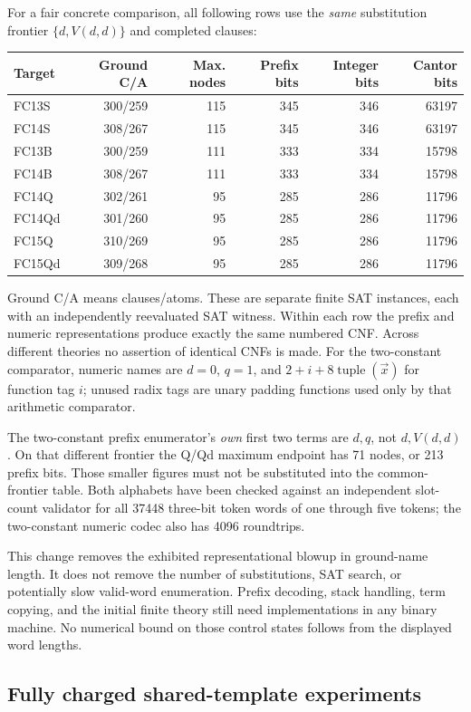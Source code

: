 For a fair concrete comparison, all following rows use the \emph{same}
substitution frontier $\{d,V(d,d)\}$ and completed clauses:
\begin{center}
\begin{tabular}{lrrrrr}
\toprule
Target & Ground C/A & Max. nodes & Prefix bits & Integer bits & Cantor bits\\
\midrule
FC13S &300/259&115&345&346&63197\\
FC14S &308/267&115&345&346&63197\\
FC13B &300/259&111&333&334&15798\\
FC14B &308/267&111&333&334&15798\\
FC14Q &302/261&95&285&286&11796\\
FC14Qd&301/260&95&285&286&11796\\
FC15Q &310/269&95&285&286&11796\\
FC15Qd&309/268&95&285&286&11796\\
\bottomrule
\end{tabular}
\end{center}
Ground C/A means clauses/atoms.  These are separate finite SAT instances,
each with an independently reevaluated SAT witness.  Within each row the
prefix and numeric representations produce exactly the same numbered CNF.
Across different theories no assertion of identical CNFs is made.  For the
two-constant comparator, numeric names are $d=0$, $q=1$, and
$2+i+8\operatorname{tuple}(\vec x)$ for function tag $i$; unused radix tags
are unary padding functions used only by that arithmetic comparator.

The two-constant prefix enumerator's \emph{own} first two terms are $d,q$,
not $d,V(d,d)$.  On that different frontier the Q/Qd maximum endpoint has
71 nodes, or 213 prefix bits.  Those smaller figures must not be substituted
into the common-frontier table.  Both alphabets have been checked against an
independent slot-count validator for all 37448 three-bit token words of one
through five tokens; the two-constant numeric codec also has 4096 roundtrips.

This change removes the exhibited representational blowup in ground-name
length.  It does not remove the number of substitutions, SAT search, or
potentially slow valid-word enumeration.  Prefix decoding, stack handling,
term copying, and the initial finite theory still need implementations in any
binary machine.  No numerical bound on those control states follows from
the displayed word lengths.

\subsection{Fully charged shared-template experiments}


